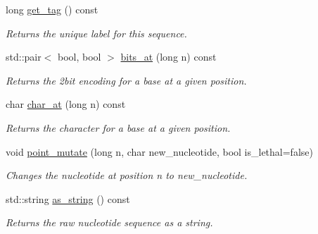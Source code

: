 \begin{DoxyCompactItemize}
\mbox{\label{classrcombinator_1_1Sequence_a5690b6b125807696c81533e7be0be296}} 
long \mbox{\hyperlink{classrcombinator_1_1Sequence_a5690b6b125807696c81533e7be0be296}{get\+\_\+tag}} () const
\begin{DoxyCompactList}\small\item\em Returns the unique label for this sequence. \end{DoxyCompactList}\item 
\mbox{\label{classrcombinator_1_1Sequence_a1367e984a24069fb18f4eb85f5c55dbb}} 
std\+::pair$<$ bool, bool $>$ \mbox{\hyperlink{classrcombinator_1_1Sequence_a1367e984a24069fb18f4eb85f5c55dbb}{bits\+\_\+at}} (long n) const
\begin{DoxyCompactList}\small\item\em Returns the 2bit encoding for a base at a given position. \end{DoxyCompactList}\item 
\mbox{\label{classrcombinator_1_1Sequence_a19672a1fbefcdf0c317fddb177f80a15}} 
char \mbox{\hyperlink{classrcombinator_1_1Sequence_a19672a1fbefcdf0c317fddb177f80a15}{char\+\_\+at}} (long n) const
\begin{DoxyCompactList}\small\item\em Returns the character for a base at a given position. \end{DoxyCompactList}\item 
void \mbox{\hyperlink{classrcombinator_1_1Sequence_a5f7bccd4725bb8c46f6b93bd01a6b2f0}{point\+\_\+mutate}} (long n, char new\+\_\+nucleotide, bool is\+\_\+lethal=false)
\begin{DoxyCompactList}\small\item\em Changes the nucleotide at position {\itshape n} to {\itshape new\+\_\+nucleotide}. \end{DoxyCompactList}\item 
\mbox{\label{classrcombinator_1_1Sequence_a5fa45e155a1e4b3c257f19369ace05a8}} 
std\+::string \mbox{\hyperlink{classrcombinator_1_1Sequence_a5fa45e155a1e4b3c257f19369ace05a8}{as\+\_\+string}} () const
\begin{DoxyCompactList}\small\item\em Returns the raw nucleotide sequence as a string. \end{DoxyCompactList}\item 

\end{DoxyCompactItemize}
